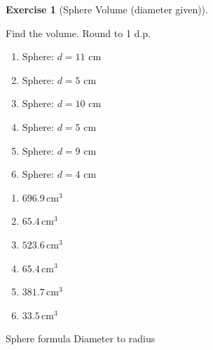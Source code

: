 \documentclass[
  letterpaper,
  DIV=11,
  numbers=noendperiod]{scrreprt}
\theoremstyle{definition}
\newtheorem{exercise}{Exercise}[chapter]
\theoremstyle{remark}
\begin{document}
\begin{exercise}[Sphere Volume (diameter
given)]\protect\hypertarget{exr-cur-8}{}\label{exr-cur-8}

Find the volume. Round to 1 d.p.

\begin{enumerate}
\def\labelenumi{\alph{enumi})}
\item
  \(\text{Sphere: }d=11\text{ cm}\)
\item
  \(\text{Sphere: }d=5\text{ cm}\)
\item
  \(\text{Sphere: }d=10\text{ cm}\)
\item
  \(\text{Sphere: }d=5\text{ cm}\)
\item
  \(\text{Sphere: }d=9\text{ cm}\)
\item
  \(\text{Sphere: }d=4\text{ cm}\)
\end{enumerate}

\begin{tcolorbox}[enhanced jigsaw, opacitybacktitle=0.6, coltitle=black, arc=.35mm, colframe=quarto-callout-tip-color-frame, colback=white, bottomrule=.15mm, left=2mm, colbacktitle=quarto-callout-tip-color!10!white, titlerule=0mm, opacityback=0, title=\textcolor{quarto-callout-tip-color}{\faLightbulb}\hspace{0.5em}{🔍 View Solution}, leftrule=.75mm, breakable, rightrule=.15mm, bottomtitle=1mm, toptitle=1mm, toprule=.15mm]

\begin{enumerate}
\def\labelenumi{\alph{enumi})}
\item
  \(696.9\,\text{cm}^{3}\)
\item
  \(65.4\,\text{cm}^{3}\)
\item
  \(523.6\,\text{cm}^{3}\)
\item
  \(65.4\,\text{cm}^{3}\)
\item
  \(381.7\,\text{cm}^{3}\)
\item
  \(33.5\,\text{cm}^{3}\)
\end{enumerate}

\end{tcolorbox}

{Sphere formula} {Diameter to radius}

\end{exercise}
\end{document}
